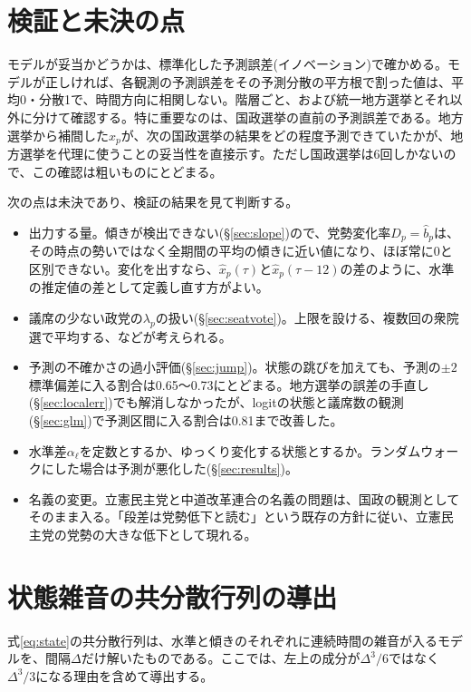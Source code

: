 \documentclass[a4paper,11pt]{ltjsarticle}
\begin{document}
\section{検証と未決の点}
\label{sec:checks}

モデルが妥当かどうかは、標準化した予測誤差(イノベーション)で確かめる。モデルが正しければ、各観測の予測誤差をその予測分散の平方根で割った値は、平均0・分散1で、時間方向に相関しない。階層ごと、および統一地方選挙とそれ以外に分けて確認する。特に重要なのは、国政選挙の直前の予測誤差である。地方選挙から補間した$\hat x_p$が、次の国政選挙の結果をどの程度予測できていたかが、地方選挙を代理に使うことの妥当性を直接示す。ただし国政選挙は6回しかないので、この確認は粗いものにとどまる。

次の点は未決であり、検証の結果を見て判断する。

\begin{itemize}
  \item 出力する量。傾きが検出できない(\S\ref{sec:slope})ので、党勢変化率$D_p=\hat b_p$は、その時点の勢いではなく全期間の平均の傾きに近い値になり、ほぼ常に0と区別できない。変化を出すなら、$\hat x_p(\tau)$と$\hat x_p(\tau-12)$の差のように、水準の推定値の差として定義し直す方がよい。
  \item 議席の少ない政党の$\lambda_p$の扱い(\S\ref{sec:seatvote})。上限を設ける、複数回の衆院選で平均する、などが考えられる。
  \item 予測の不確かさの過小評価(\S\ref{sec:jump})。状態の跳びを加えても、予測の$\pm2$標準偏差に入る割合は0.65〜0.73にとどまる。地方選挙の誤差の手直し(\S\ref{sec:localerr})でも解消しなかったが、logitの状態と議席数の観測(\S\ref{sec:glm})で予測区間に入る割合は0.81まで改善した。
  \item 水準差$\alpha_\ell$を定数とするか、ゆっくり変化する状態とするか。ランダムウォークにした場合は予測が悪化した(\S\ref{sec:results})。
  \item 名義の変更。立憲民主党と中道改革連合の名義の問題は、国政の観測としてそのまま入る。「段差は党勢低下と読む」という既存の方針に従い、立憲民主党の党勢の大きな低下として現れる。
\end{itemize}

\appendix
\section{状態雑音の共分散行列の導出}
\label{app:Q}

式\eqref{eq:state}の共分散行列は、水準と傾きのそれぞれに連続時間の雑音が入るモデルを、間隔$\Delta$だけ解いたものである。ここでは、左上の成分が$\Delta^3/6$ではなく$\Delta^3/3$になる理由を含めて導出する。
\end{document}

